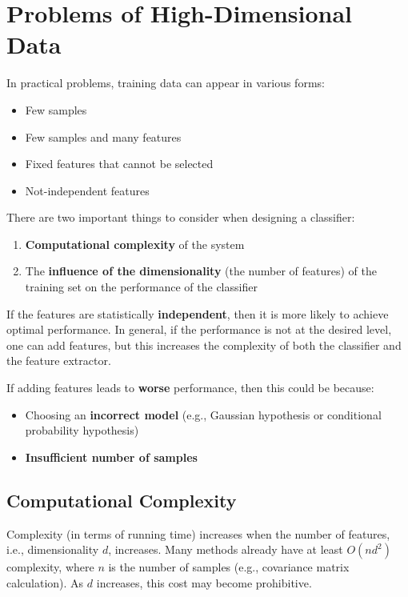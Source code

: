 \documentclass[11pt,a4paper]{article}
\theoremstyle{definition}
\theoremstyle{plain}
\theoremstyle{remark}
\begin{document}
\section{Problems of High-Dimensional Data}

In practical problems, training data can appear in various forms:
\begin{itemize}
    \item Few samples
    \item Few samples and many features
    \item Fixed features that cannot be selected
    \item Not-independent features
\end{itemize}

There are two important things to consider when designing a classifier:
\begin{enumerate}
    \item \textbf{Computational complexity} of the system
    \item The \textbf{influence of the dimensionality} (the number of features) of the training set on the performance of the classifier
\end{enumerate}

If the features are statistically \textbf{independent}, then it is more likely to achieve optimal performance. In general, if the performance is not at the desired level, one can add features, but this increases the complexity of both the classifier and the feature extractor.

If adding features leads to \textbf{worse} performance, then this could be because:
\begin{itemize}
    \item Choosing an \textbf{incorrect model} (e.g., Gaussian hypothesis or conditional probability hypothesis)
    \item \textbf{Insufficient number of samples}
\end{itemize}

\subsection{Computational Complexity}

Complexity (in terms of running time) increases when the number of features, i.e., dimensionality $d$, increases. Many methods already have at least $O(nd^2)$ complexity, where $n$ is the number of samples (e.g., covariance matrix calculation). As $d$ increases, this cost may become prohibitive.
\end{document}
